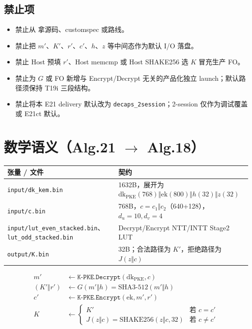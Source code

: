 \documentclass[UTF8,a4paper,11pt]{ctexart}
\newcommand{\dirname}[1]{\texttt{\seqsplit{#1}}}
\begin{document}
\subsection{禁止项}
\begin{itemize}
  \item 禁止从 \dirname{frozen/} 拿源码、customspec 或路线。
  \item 禁止把 $m'$、$K'$、$r'$、$c'$、$h$、$z$ 等中间态作为默认 I/O 落盘。
  \item 禁止 Host 预填 $r'$、Host memcmp 或 Host SHAKE256 选 $K$ 冒充生产 FO。
  \item 禁止为 $G$ 或 FO 新增与 Encrypt/Decrypt 无关的产品化独立 launch；默认路径须保持 T19i 三段结构。
  \item 禁止将本 E21 delivery 默认改为 \texttt{decaps\_2session}；2-session 仅作为调试覆盖或 E21ct 默认。
\end{itemize}

\section{数学语义（Alg.21 $\to$ Alg.18）}

\begin{longtable}{@{}L{3.5cm}L{9.8cm}@{}}
\toprule
张量 / 文件 & 契约 \\
\midrule
\texttt{input/dk\_kem.bin} & 1632B，展开为 $\mathrm{dk}_{\mathrm{PKE}}(768)\Vert \mathrm{ek}(800)\Vert h(32)\Vert z(32)$ \\
\texttt{input/c.bin} & 768B，$c=c_1\Vert c_2$（640+128），$d_u=10,d_v=4$ \\
\texttt{input/lut\_even\_stacked.bin}、\texttt{lut\_odd\_stacked.bin} & Decrypt/Encrypt NTT/INTT Stage2 LUT \\
\texttt{output/K.bin} & 32B；合法路径为 $K'$，拒绝路径为 $J(z\Vert c)$ \\
\bottomrule
\end{longtable}

\begin{align*}
  m' &\leftarrow \texttt{K-PKE.Decrypt}(\mathrm{dk}_{\mathrm{PKE}}, c) \\
  (K'\Vert r') &\leftarrow G(m'\Vert h)=\mathrm{SHA3\textrm{-}512}(m'\Vert h) \\
  c' &\leftarrow \texttt{K-PKE.Encrypt}(\mathrm{ek}, m', r') \\
  K &\leftarrow
    \begin{cases}
      K' & \text{若 } c=c' \\
      J(z\Vert c)=\mathrm{SHAKE256}(z\Vert c,32) & \text{若 } c\neq c'
    \end{cases}
\end{align*}
\end{document}
